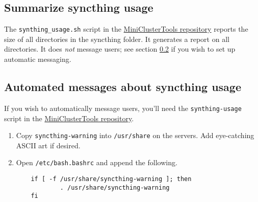 \subsection{Summarize syncthing usage} \label{subsec:syncsize}

The \texttt{synthing\_usage.sh} script in the \href{https://github.com/coyleej/MiniClusterTools}{MiniClusterTools repository} reports the size of all directories in the syncthing folder. It generates a report on all directories. It does \emph{not} message users; see section \ref{subsec:syncautomessage} if you wish to set up automatic messaging.

\subsection{Automated messages about syncthing usage} \label{subsec:syncautomessage}

If you wish to automatically message users, you'll need the \texttt{synthing-usage} script in the \href{https://github.com/coyleej/MiniClusterTools}{MiniClusterTools repository}.

\begin{enumerate}
  \item Copy \texttt{syncthing-warning} into \texttt{/usr/share} on the servers. Add eye-catching ASCII art if desired.

  \item Open \texttt{/etc/bash.bashrc} and append the following.

	\begin{verbatim}
	if [ -f /usr/share/syncthing-warning ]; then
	        . /usr/share/syncthing-warning
	fi
	\end{verbatim}
\end{enumerate}
